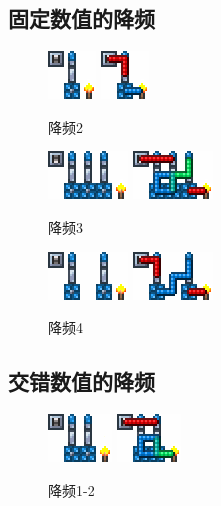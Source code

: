 \subsection{固定数值的降频}
\begin{figure}[!ht]
    \centering
    \includegraphics{images/327.png}
    \qquad
    \includegraphics{images/328.png}
    \caption{降频2}
\end{figure}
\begin{figure}[!ht]
    \centering
    \includegraphics{images/331.png}
    \qquad
    \includegraphics{images/332.png}
    \caption{降频3}
\end{figure}
\begin{figure}[!ht]
    \centering
    \includegraphics{images/334.png}
    \qquad
    \includegraphics{images/333.png}
    \caption{降频4}
\end{figure}
\subsection{交错数值的降频}
\begin{figure}[!ht]
    \centering
    \includegraphics{images/330.png}
    \qquad
    \includegraphics{images/329.png}
    \caption{降频1-2}
\end{figure}
